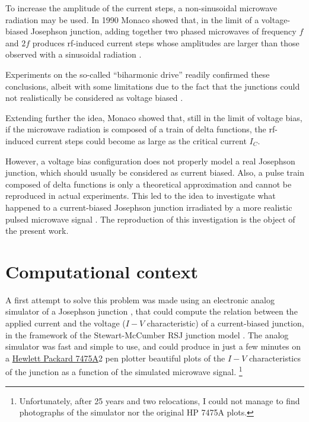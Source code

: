 To increase the amplitude of the current steps, a non-sinusoidal microwave radiation may be used.
In 1990 Monaco showed that, in the limit of a voltage-biased Josephson junction, adding together two phased microwaves of frequency $f$ and $2 f$ produces rf-induced current steps whose amplitudes are larger than those observed with a sinusoidal radiation \cite{Monaco:1990}.

Experiments on the so-called ``biharmonic drive'' readily confirmed these conclusions, albeit with some limitations due to the fact that the junctions could not realistically be considered as voltage biased \cite{Andreone:1991, Andreone:1992}.

Extending further the idea, Monaco showed that, still in the limit of voltage bias, if the microwave radiation is composed of a train of delta functions, the rf-induced current steps could become as large as the critical current $I_C$.

However, a voltage bias configuration does not properly model a real Josephson junction, which  should usually be considered as current biased.
Also, a pulse train composed of delta functions is only a theoretical approximation and cannot be reproduced in actual experiments.
This led to the idea to investigate what happened to a current-biased Josephson junction irradiated by a more realistic pulsed microwave signal \cite{Maggi:1996, Maggi:1997}. 
The reproduction of this investigation is the object of the present work.



\section{Computational context}
\label{computational-context}

A first attempt to solve this problem was made using an electronic analog simulator of a Josephson junction \cite {Henry:1981}, that could compute the relation between the applied current and the voltage ($I-V$ characteristic) of a current-biased junction, in the framework of the Stewart-McCumber RSJ junction model \cite{McCumber:1968, Stewart:1974}.
The analog simulator was fast and simple to use, and could produce in just a few minutes on a \href{http://www.hpmuseum.net/display_item.php?hw=74}{Hewlett Packard 7475A}2 pen plotter beautiful plots of the $I-V$ characteristics of the junction as a function of the simulated microwave signal.
\footnote{Unfortunately, after 25 years and two relocations, I could not manage to find photographs of the simulator nor the original HP 7475A plots.} 

